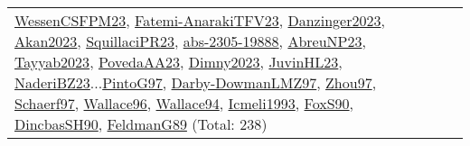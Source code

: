 {\begin{longtable}{p{3cm}r>{\raggedright\arraybackslash}p{6cm}>{\raggedright\arraybackslash}p{6cm}>{\raggedright\arraybackslash}p{8cm}}
\hyperref[detail:WessenCSFPM23]{WessenCSFPM23}, \hyperref[detail:Fatemi-AnarakiTFV23]{Fatemi-AnarakiTFV23}, \hyperref[detail:Danzinger2023]{Danzinger2023}, \hyperref[detail:Akan2023]{Akan2023}, \hyperref[detail:SquillaciPR23]{SquillaciPR23}, \hyperref[detail:abs-2305-19888]{abs-2305-19888}, \hyperref[detail:AbreuNP23]{AbreuNP23}, \hyperref[detail:Tayyab2023]{Tayyab2023}, \hyperref[detail:PovedaAA23]{PovedaAA23}, \hyperref[detail:Dimny2023]{Dimny2023}, \hyperref[detail:JuvinHL23]{JuvinHL23}, \hyperref[detail:NaderiBZ23]{NaderiBZ23}...\hyperref[detail:PintoG97]{PintoG97}, \hyperref[detail:Darby-DowmanLMZ97]{Darby-DowmanLMZ97}, \hyperref[detail:Zhou97]{Zhou97}, \hyperref[detail:Schaerf97]{Schaerf97}, \hyperref[detail:Wallace96]{Wallace96}, \hyperref[detail:Wallace94]{Wallace94}, \hyperref[detail:Icmeli1993]{Icmeli1993}, \hyperref[detail:FoxS90]{FoxS90}, \hyperref[detail:DincbasSH90]{DincbasSH90}, \hyperref[detail:FeldmanG89]{FeldmanG89} (Total: 238)\\

\end{longtable}}

